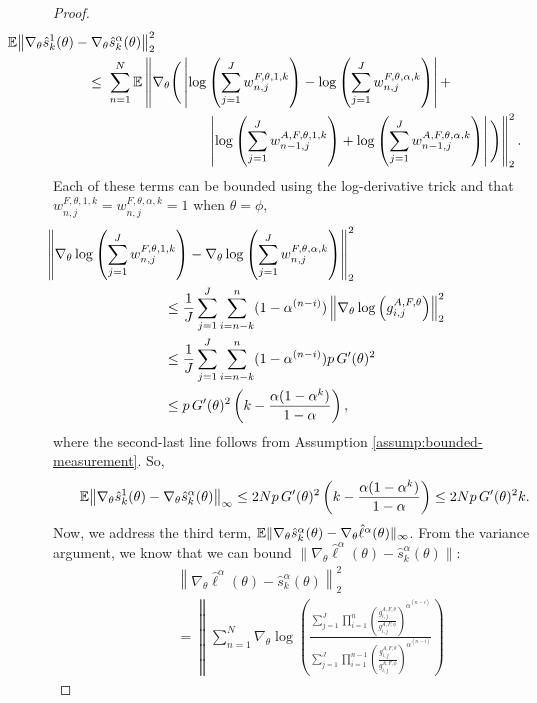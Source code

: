 \begin{proof}
\begin{align}
    & \hspace{-20mm} \nonumber
    \E\big\|\nabla_\theta\hat s_k^1(\theta) - \nabla_\theta\hat s_k^\alpha(\theta)\big\|_2^2
    \\ \nonumber
    &\leq \; \sum_{n=1}^N \E\left\lVert\nabla_\theta \Bigg(\left|\log\left(\sum_{j=1}^Jw_{n,j}^{F,\theta,1,k}\right)- \log\left(\sum_{j=1}^Jw_{n,j}^{F,\theta,\alpha,k}\right)\right|
    + \right.
    \\ & \hspace{30mm} \left.
    \left|\log\left(\sum_{j=1}^Jw_{n-1,j}^{A, F,\theta,1,k}\right) + \log\left(\sum_{j=1}^Jw_{n-1,j}^{A, F,\theta,\alpha,k}\right)\right|\Bigg)\right\rVert_2^2.
\end{align}
Each of these terms can be bounded using the log-derivative trick and that $w_{n,j}^{F,\theta,1,k} = w_{n,j}^{F,\theta,\alpha,k} = 1$ when $\theta=\phi$,
\begin{align}
    & \hspace{-30mm}
    \left\lVert\nabla_\theta\log\left(\sum_{j=1}^J w_{n,j}^{F,\theta,1,k}\right)-\nabla_\theta\log\left(\sum_{j=1}^J w_{n,j}^{F,\theta,\alpha,k}\right)\right\rVert_{2}^2
    \\
    &\leq \frac{1}{J}\sum_{j=1}^J \sum_{i=n-k}^{n}(1-\alpha^{(n-i)})\left\lVert\nabla_\theta\log\left(g_{i,j}^{A,F,\theta} \right)\right\rVert_2^2
    \\
    &\leq \frac{1}{J}\sum_{j=1}^J \sum_{i=n-k}^{n}(1-\alpha^{(n-i)})p \, G'(\theta)^2
    \\
    &\leq p \, G'(\theta)^2\left(k-\frac{\alpha(1-\alpha^k)}{1-\alpha}\right),
\end{align}
where the second-last line follows from Assumption \ref{assump:bounded-measurement}.
So, 
\begin{align}
    \mathbb{E}\big\|\nabla_\theta\hat s_k^1(\theta) - \nabla_\theta\hat s_k^\alpha(\theta)\big\|_\infty
    \leq 2Np \, G'(\theta)^2\left(k-\frac{\alpha(1-\alpha^k)}{1-\alpha}\right) 
    \leq 2Np \, G'(\theta)^2k.
\end{align}
Now, we address the third term, $\mathbb{E}\|\nabla_\theta\hat s_k^\alpha(\theta) -  \nabla_\theta\hat\ell^\alpha(\theta)\|_\infty$. From the variance argument, we know that we can bound $\|\nabla_\theta\hat\ell^\alpha(\theta) - \hat s_k^\alpha(\theta)\|$:
\begin{align}
    &\left\lVert \nabla_\theta\hat\ell^\alpha(\theta) - \hat s_k^\alpha(\theta) \right\rVert_2^2
    \\
    &= \left\lVert\sum_{n=1}^N \! \nabla_\theta \log \! \left( \! \frac{\sum_{j=1}^J\prod_{i=1}^n\left(\frac{g_{i,j}^{A,F,\theta}}{g_{i,j}^{A,F,\phi}} \right)^{\alpha^{(n-i)}}}{\sum_{j=1}^J\prod_{i=1}^{n-1}\left(\frac{g_{i,j}^{A,F,\theta}}{g_{i,j}^{A,F,\phi}} \right)^{\alpha^{(n-i)}}}\right) 

\end{align}
\end{proof}
